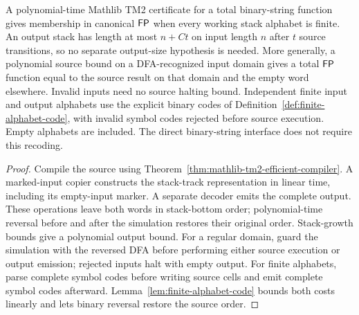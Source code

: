 \begin{theorem}
  \label{thm:mathlib-tm2-canonical-fp}
  \leanok
  A polynomial-time Mathlib TM2 certificate for a total binary-string function
  gives membership in canonical $\mathsf{FP}$ when every working stack alphabet is
  finite. An output stack has length at most $n+Ct$ on input length $n$ after
  $t$ source transitions, so no separate output-size hypothesis is needed.
  More generally, a polynomial source bound on a DFA-recognized input domain
  gives a total $\mathsf{FP}$ function equal to the source result on that domain and
  the empty word elsewhere. Invalid inputs need no source halting bound.
  Independent finite input and output alphabets use the explicit binary codes
  of Definition~\ref{def:finite-alphabet-code}, with invalid symbol codes
  rejected before source execution. Empty alphabets are included. The direct
  binary-string interface does not require this recoding.
\end{theorem}
\begin{proof}
  \leanok
  Compile the source using Theorem~\ref{thm:mathlib-tm2-efficient-compiler}.
  A marked-input copier constructs the stack-track representation in linear
  time, including its empty-input marker. A separate decoder emits the complete
  output. These operations leave both words in stack-bottom order; polynomial-time
  reversal before and after the simulation restores their original order.
  Stack-growth bounds give a polynomial output bound. For a regular domain,
  guard the simulation with the reversed DFA before performing either source
  execution or output emission; rejected inputs halt with empty output.
  For finite alphabets, parse complete symbol codes before writing source cells
  and emit complete symbol codes afterward. Lemma~\ref{lem:finite-alphabet-code}
  bounds both costs linearly and lets binary reversal restore the source order.
\end{proof}

